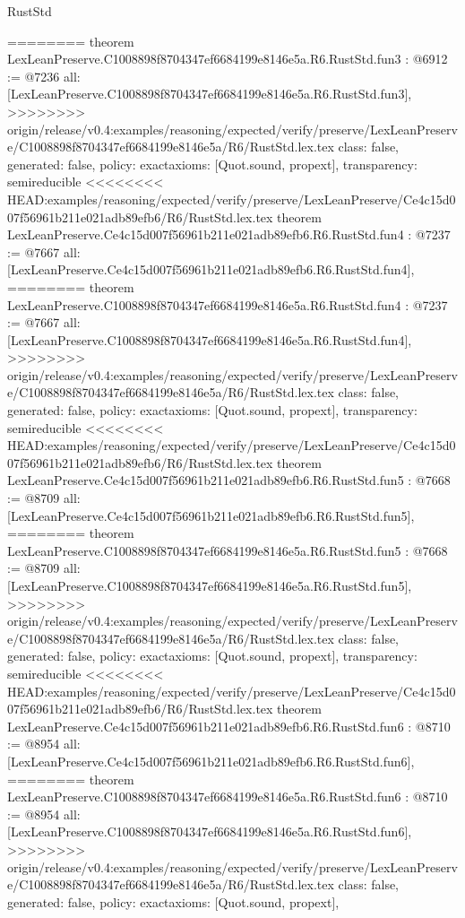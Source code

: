 \begin{lexlean}{RustStd}
\begin{coremodule}
{\begin{coremodule}
{{{{{{========
theorem LexLeanPreserve.C1008898f8704347ef6684199e8146e5a.R6.RustStd.fun3 : @6912 := @7236 {
  all: [LexLeanPreserve.C1008898f8704347ef6684199e8146e5a.R6.RustStd.fun3],
>>>>>>>> origin/release/v0.4:examples/reasoning/expected/verify/preserve/LexLeanPreserve/C1008898f8704347ef6684199e8146e5a/R6/RustStd.lex.tex
  class: false,
  generated: false,
  policy: exact{axioms: [Quot.sound, propext]},
  transparency: semireducible
}
<<<<<<<< HEAD:examples/reasoning/expected/verify/preserve/LexLeanPreserve/Ce4c15d007f56961b211e021adb89efb6/R6/RustStd.lex.tex
theorem LexLeanPreserve.Ce4c15d007f56961b211e021adb89efb6.R6.RustStd.fun4 : @7237 := @7667 {
  all: [LexLeanPreserve.Ce4c15d007f56961b211e021adb89efb6.R6.RustStd.fun4],
========
theorem LexLeanPreserve.C1008898f8704347ef6684199e8146e5a.R6.RustStd.fun4 : @7237 := @7667 {
  all: [LexLeanPreserve.C1008898f8704347ef6684199e8146e5a.R6.RustStd.fun4],
>>>>>>>> origin/release/v0.4:examples/reasoning/expected/verify/preserve/LexLeanPreserve/C1008898f8704347ef6684199e8146e5a/R6/RustStd.lex.tex
  class: false,
  generated: false,
  policy: exact{axioms: [Quot.sound, propext]},
  transparency: semireducible
}
<<<<<<<< HEAD:examples/reasoning/expected/verify/preserve/LexLeanPreserve/Ce4c15d007f56961b211e021adb89efb6/R6/RustStd.lex.tex
theorem LexLeanPreserve.Ce4c15d007f56961b211e021adb89efb6.R6.RustStd.fun5 : @7668 := @8709 {
  all: [LexLeanPreserve.Ce4c15d007f56961b211e021adb89efb6.R6.RustStd.fun5],
========
theorem LexLeanPreserve.C1008898f8704347ef6684199e8146e5a.R6.RustStd.fun5 : @7668 := @8709 {
  all: [LexLeanPreserve.C1008898f8704347ef6684199e8146e5a.R6.RustStd.fun5],
>>>>>>>> origin/release/v0.4:examples/reasoning/expected/verify/preserve/LexLeanPreserve/C1008898f8704347ef6684199e8146e5a/R6/RustStd.lex.tex
  class: false,
  generated: false,
  policy: exact{axioms: [Quot.sound, propext]},
  transparency: semireducible
}
<<<<<<<< HEAD:examples/reasoning/expected/verify/preserve/LexLeanPreserve/Ce4c15d007f56961b211e021adb89efb6/R6/RustStd.lex.tex
theorem LexLeanPreserve.Ce4c15d007f56961b211e021adb89efb6.R6.RustStd.fun6 : @8710 := @8954 {
  all: [LexLeanPreserve.Ce4c15d007f56961b211e021adb89efb6.R6.RustStd.fun6],
========
theorem LexLeanPreserve.C1008898f8704347ef6684199e8146e5a.R6.RustStd.fun6 : @8710 := @8954 {
  all: [LexLeanPreserve.C1008898f8704347ef6684199e8146e5a.R6.RustStd.fun6],
>>>>>>>> origin/release/v0.4:examples/reasoning/expected/verify/preserve/LexLeanPreserve/C1008898f8704347ef6684199e8146e5a/R6/RustStd.lex.tex
  class: false,
  generated: false,
  policy: exact{axioms: [Quot.sound, propext]},
}}}}}}}}}}
\end{coremodule}}
\end{coremodule}
\end{lexlean}
